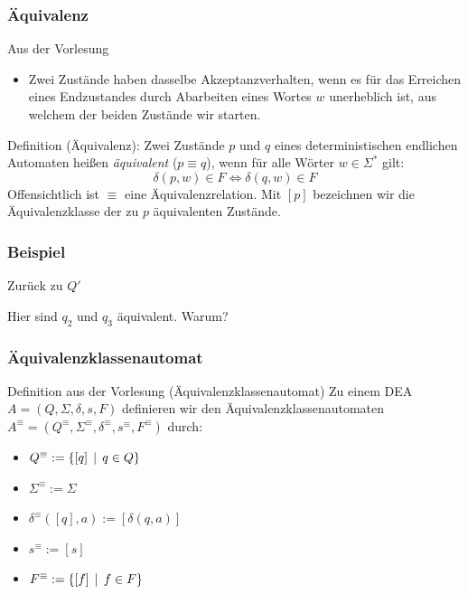 \begin{frame}
 \frametitle{Äquivalenz}
 \begin{block}{Aus der Vorlesung}
  \begin{itemize}
   \item Zwei Zustände haben dasselbe Akzeptanzverhalten, wenn es für das Erreichen eines Endzustandes durch Abarbeiten eines Wortes $w$
   unerheblich ist, aus welchem der beiden Zustände wir starten.
  \end{itemize}
 \end{block}
 \begin{block}{Definition (Äquivalenz):}
  Zwei Zustände $p$ und $q$ eines deterministischen endlichen Automaten heißen \emph{äquivalent} ($p \equiv q$),
  wenn für alle Wörter $w\in\Sigma^*$ gilt:
  \[
   \delta(p, w)\in F \Leftrightarrow \delta(q, w)\in F
  \]
  Offensichtlich ist $\equiv$ eine Äquivalenzrelation. Mit $[p]$ bezeichnen wir die Äquivalenzklasse der zu $p$ äquivalenten Zustände.
 \end{block}
\end{frame}
\begin{frame}
 \frametitle{Beispiel}
 \begin{block}{Zurück zu $Q'$}
 \begin{figure}[h]
\begin{center}
\end{center}
\end{figure}
Hier sind $q_2$ und $q_3$ äquivalent. Warum?
\end{block}
\end{frame}
\begin{frame}
 \frametitle{Äquivalenzklassenautomat}
 \begin{block}{Definition aus der Vorlesung (Äquivalenzklassenautomat)}
  Zu einem DEA \(A = (Q, \Sigma, \delta, s, F)\) definieren wir den Äquivalenzklassenautomaten 
  \(A^\equiv = (Q^\equiv, \Sigma^\equiv, \delta^\equiv, s^\equiv, F^\equiv)\) durch:
  \begin{itemize}
   \item $Q^\equiv := \left\lbrace [q] \,\mid\, q\in Q \right\rbrace$
   \item $\Sigma^\equiv := \Sigma$
   \item $\delta^\equiv([q], a) := [\delta(q, a)]$
   \item $s^\equiv := [s]$
   \item $F^\equiv:= \left\lbrace [f] \,\mid\, f\in F \right\rbrace$
  \end{itemize}
 \end{block}
\end{frame}
